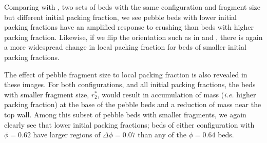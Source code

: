 Comparing  with , two sets of beds with the same configuration and fragment size but different initial packing fraction, we see pebble beds with lower initial packing fractions have an amplified response to crushing than beds with higher packing fraction. Likewise, if we flip the orientation such as in  and , there is again a more widespread change in local packing fraction for beds of smaller initial packing fractions.

The effect of pebble fragment size to local packing fraction is also revealed in these images. For both configurations, and all initial packing fractions, the beds with smaller fragment size, $r_2^*$, would result in accumulation of mass (\textit{i.e.} higher packing fraction) at the base of the pebble beds and a reduction of mass near the top wall. Among this subset of pebble beds with smaller fragments, we again clearly see that lower initial packing fractions; beds of either configuration with $\phi = 0.62$ have larger regions of $\Delta \phi = 0.07$ than any of the $\phi = 0.64$ beds.




